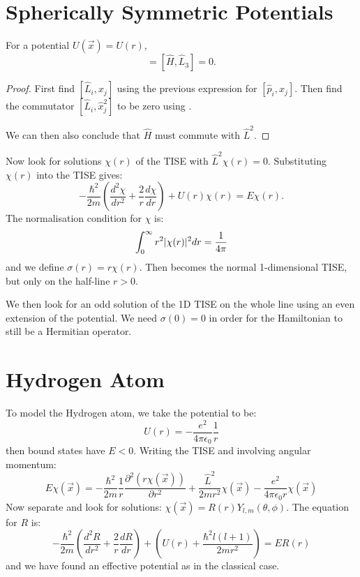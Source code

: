 \documentclass[../Main.tex]{subfiles}
\begin{document}
\section{Spherically Symmetric Potentials}
\begin{proposition}
    For a potential $U(\vec{x}) = U(r)$,
    \begin{equation*}
        [\hat{H}, \hat{L}^2] = [\hat{H}, \hat{L}_3] = 0.
    \end{equation*}
    \label{propMutCmmtOperators}
\end{proposition}
\begin{proof}
    First find $[\hat{L}_i, \hat{x}_j]$ using the previous expression for $[\hat{p}_i, \hat{x}_j]$. Then find the commutator $[\hat{L}_i, \hat{x}_j^2]$ to be zero using . 

    We can then also conclude that $\hat{H}$ must commute with $\hat{L}^2$.
\end{proof}

Now look for solutions $\chi(r)$ of the TISE with $\hat{L}^2 \chi(r) = 0$. Substituting $\chi(r)$ into the TISE gives:
\begin{equation}
    -\frac{\hbar^2}{2m} \left(\frac{d^{2}\chi}{dr^{2}} + \frac{2}{r} \frac{d\chi}{dr}\right) + U(r) \chi(r) = E\chi(r).
    \label{eqnTISESphSymm}
\end{equation}
The normalisation condition for $\chi$ is:
\begin{equation*}
    \int_{0}^{\infty} r^2\lvert\chi(r)\rvert^2 dr = \frac{1}{4\pi}
\end{equation*}
and we define $\sigma(r) = r\chi(r)$. Then  becomes the normal 1-dimensional TISE, but only on the half-line $r > 0$.

We then look for an odd solution of the 1D TISE on the whole line using an even extension of the potential. We need $\sigma(0) = 0$ in order for the Hamiltonian to still be a Hermitian operator.
\section{Hydrogen Atom}
To model the Hydrogen atom, we take the potential to be:
\begin{equation*}
    U(r) = -\frac{e^2}{4\pi\epsilon_0} \frac1r
\end{equation*}
then bound states have $E < 0$. Writing the TISE and involving angular momentum:
\begin{equation*}
    E\chi(\vec{x}) = -\frac{\hbar^2}{2m} \frac1r \frac{\partial^{2}(r\chi(\vec{x}))}{\partial r^{2}} + \frac{\hat{L}^2}{2mr^2} \chi(\vec{x}) -\frac{e^2}{4\pi\epsilon_0r} \chi(\vec{x})
\end{equation*}
Now separate and look for solutions: $\chi(\vec{x}) = R(r) Y_{l, m}(\theta, \phi)$. The equation for $R$ is:
\begin{equation*}
    -\frac{\hbar^2}{2m} \left(\frac{d^{2}R}{dr^{2}} + \frac{2}{r} \frac{dR}{dr}\right) + \left(U(r) + \frac{\hbar^2 l(l+1)}{2mr^2}\right) = ER(r)
\end{equation*}
and we have found an effective potential as in the classical case.
\end{document}
